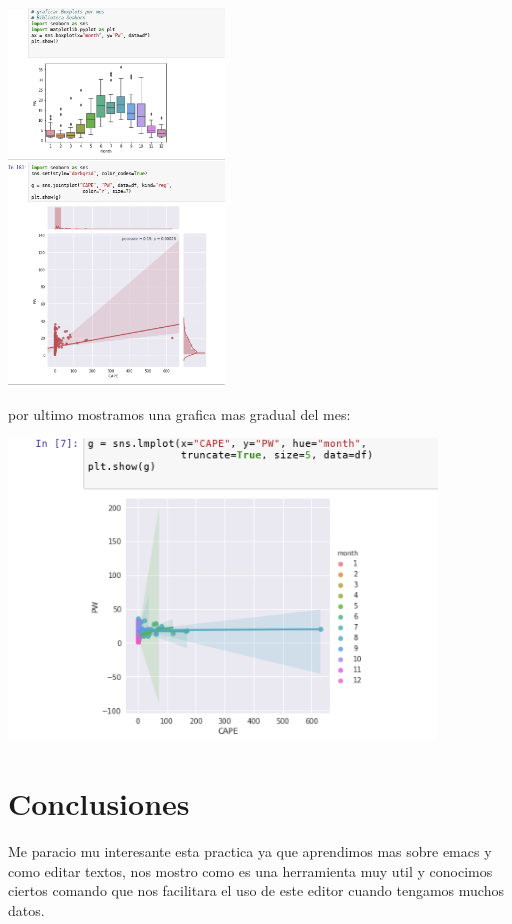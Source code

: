 \documentclass{article}
\begin{document}
\begin{itemize}
\begin{center}
\includegraphics[height=10cm]{jupyter3.png}
\end{center}


por ultimo mostramos una grafica mas gradual del mes:

\begin{center}
\includegraphics[height=8cm]{jupyter4.png}
\end{center}




\end{itemize}

\section{Conclusiones}

Me paracio mu interesante esta practica ya que aprendimos mas sobre emacs y como editar textos, nos mostro como es una herramienta muy util y conocimos ciertos comando que nos facilitara el uso de este editor cuando tengamos muchos datos.
\end{document}
